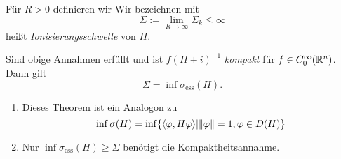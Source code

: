 \documentclass{mycourse}
\begin{document}
Für $R>0$ definieren wir
Wir bezeichnen mit
\[
\Sigma := \lim_{R\to \infty} \Sigma_k \le \infty
\]
heißt \emph{Ionisierungsschwelle} von $H$.
\begin{st}[Persson 1960]
Sind obige Annahmen erfüllt und ist $f(H+i)^{-1}$ \emph{kompakt} für $f\in C_0^\infty(\mathbb{R}^n)$. Dann gilt
\[
\Sigma= \inf \sigma_{\text{ess}}(H).
\] 
\end{st}

\begin{nt*}
\begin{enumerate}
\item Dieses Theorem ist ein Analogon zu 
\[
\inf \sigma(H) = \inf \{ \langle \varphi, H\varphi\rangle | \| \varphi \| = 1, \varphi \in D(H)\}
\]
\item Nur $\inf \sigma_{\text{ess}}(H)\ge \Sigma$ benötigt die Kompaktheitsannahme.
\end{enumerate}
\end{nt*}
\end{document}
